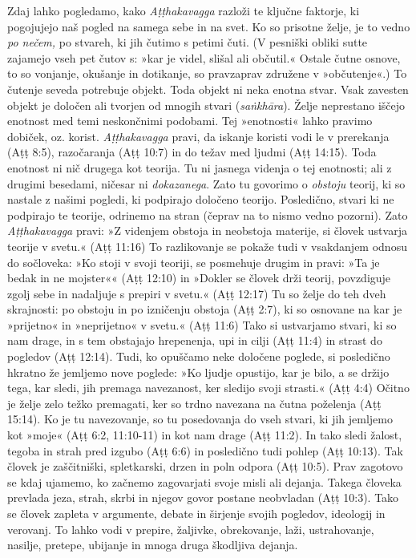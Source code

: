 Zdaj lahko pogledamo, kako \emph{Aṭṭhakavagga} razloži te ključne
faktorje, ki pogojujejo naš pogled na samega sebe in na svet. Ko so
prisotne želje, je to vedno \emph{po nečem,} po stvareh, ki jih čutimo s
petimi čuti. (V pesniški obliki sutte zajamejo vseh pet čutov s: »kar je
videl, slišal ali občutil.« Ostale čutne osnove, to so vonjanje,
okušanje in dotikanje, so pravzaprav združene v »občutenje«.) To čutenje
seveda potrebuje objekt. Toda objekt ni neka enotna stvar. Vsak zavesten
objekt je določen ali tvorjen od mnogih stvari (\emph{saṅkhāra}). Želje
neprestano iščejo enotnost med temi neskončnimi podobami. Tej
»enotnosti« lahko pravimo dobiček, oz. korist. \emph{Aṭṭhakavagga}
pravi, da iskanje koristi vodi le v prerekanja (Aṭṭ 8:5), razočaranja
(Aṭṭ 10:7) in do težav med ljudmi (Aṭṭ 14:15). Toda enotnost ni nič
drugega kot teorija. Tu ni jasnega videnja o tej enotnosti; ali z
drugimi besedami, ničesar ni \emph{dokazanega}. Zato tu govorimo o
\emph{obstoju} teorij, ki so nastale z našimi pogledi, ki podpirajo
določeno teorijo. Posledično, stvari ki ne podpirajo te teorije,
odrinemo na stran (čeprav na to nismo vedno pozorni). Zato
\emph{Aṭṭhakavagga} pravi: »Z videnjem obstoja in neobstoja materije, si
človek ustvarja teorije v svetu.« (Aṭṭ 11:16) To razlikovanje se pokaže
tudi v vsakdanjem odnosu do sočloveka: »Ko stoji v svoji teoriji, se
posmehuje drugim in pravi: »Ta je bedak in ne mojster«« (Aṭṭ 12:10) in
»Dokler se človek drži teorij, povzdiguje zgolj sebe in nadaljuje s
prepiri v svetu.« (Aṭṭ 12:17) Tu so želje do teh dveh skrajnosti: po
obstoju in po izničenju obstoja (Aṭṭ 2:7), ki so osnovane na kar je
»prijetno« in »neprijetno« v svetu.« (Aṭṭ 11:6) Tako si ustvarjamo
stvari, ki so nam drage, in s tem obstajajo hrepenenja, upi in cilji
(Aṭṭ 11:4) in strast do pogledov (Aṭṭ 12:14). Tudi, ko opuščamo neke
določene poglede, si posledično hkratno že jemljemo nove poglede: »Ko
ljudje opustijo, kar je bilo, a se držijo tega, kar sledi, jih premaga
navezanost, ker sledijo svoji strasti.« (Aṭṭ 4:4) Očitno je želje zelo
težko premagati, ker so trdno navezana na čutna poželenja (Aṭṭ 15:14).
Ko je tu navezovanje, so tu posedovanja do vseh stvari, ki jih jemljemo
kot »moje« (Aṭṭ 6:2, 11:10-11) in kot nam drage (Aṭṭ 11:2). In tako
sledi žalost, tegoba in strah pred izgubo (Aṭṭ 6:6) in posledično tudi
pohlep (Aṭṭ 10:13). Tak človek je zaščitniški, spletkarski, drzen in
poln odpora (Aṭṭ 10:5). Prav zagotovo se kdaj ujamemo, ko začnemo
zagovarjati svoje misli ali dejanja. Takega človeka prevlada jeza,
strah, skrbi in njegov govor postane neobvladan (Aṭṭ 10:3). Tako se
človek zapleta v argumente, debate in širjenje svojih pogledov,
ideologij in verovanj. To lahko vodi v prepire, žaljivke, obrekovanje,
laži, ustrahovanje, nasilje, pretepe, ubijanje in mnoga druga škodljiva
dejanja.

